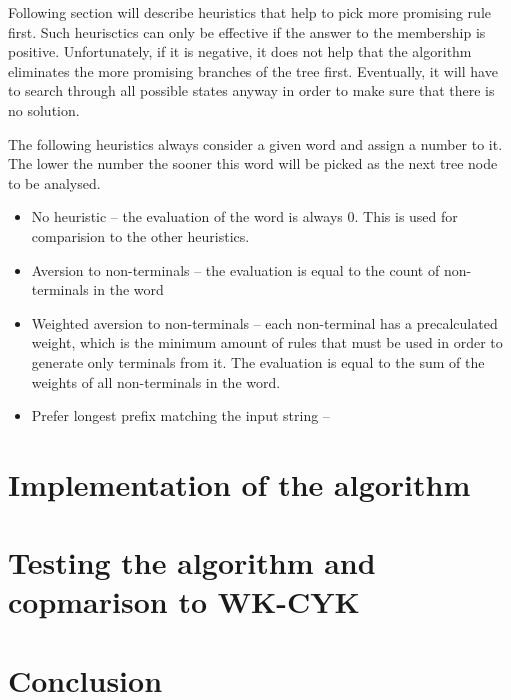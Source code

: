 \begin{enumerate}
Following section will describe heuristics that help to pick more promising rule first. Such heurisctics can only be effective if the answer to the membership is positive. Unfortunately, if it is negative, it does not help that the algorithm eliminates the more promising branches of the tree first. Eventually, it will have to search through all possible states anyway in order to make sure that there is no solution.

The following heuristics always consider a given word and assign a number to it. The lower the number the sooner this word will be picked as the next tree node to be analysed.

\begin{itemize}
  \item{No heuristic -- the evaluation of the word is always 0. This is used for comparision to the other heuristics.}
  \item{Aversion to non-terminals -- the evaluation is equal to the count of non-terminals in the word}
  \item{Weighted aversion to non-terminals -- each non-terminal has a precalculated weight, which is the minimum amount of rules that must be used in order to generate only terminals from it. The evaluation is equal to the sum of the weights of all non-terminals in the word.}
  \item{Prefer longest prefix matching the input string -- }
\end{itemize}



\end{enumerate}


\chapter{Implementation of the algorithm}

\chapter{Testing the algorithm and copmarison to WK-CYK}

\chapter{Conclusion}
